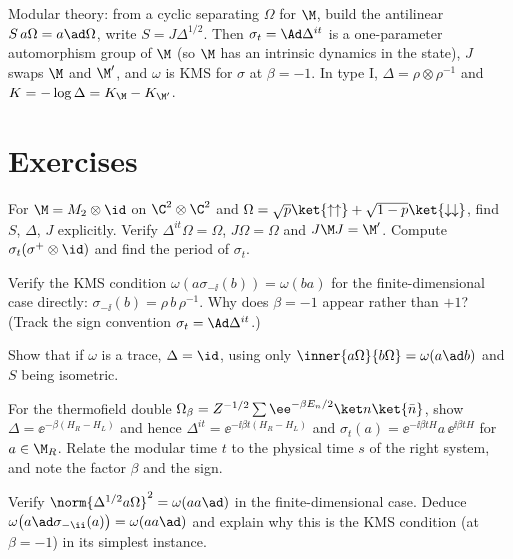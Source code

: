 \begin{keyidea}
Modular theory: from a cyclic separating $\Omega$ for $\M$, build the antilinear $S\,a\Omega=a\ad\Omega$, write $S=J\Delta^{1/2}$. Then $\sigma_t=\Ad\Delta^{it}$ is a one-parameter automorphism group of $\M$ (so $\M$ has an intrinsic dynamics in the state), $J$ swaps $\M$ and $\M'$, and $\omega$ is KMS for $\sigma$ at $\beta=-1$. In type I, $\Delta=\rho\otimes\rho^{-1}$ and $K=-\log\Delta=K_\M-K_{\M'}$.
\end{keyidea}

\section*{Exercises}
\begin{exercise}
For $\M=M_2\otimes\id$ on $\C^2\otimes\C^2$ and $\Omega=\sqrt p\ket{\uparrow\uparrow}+\sqrt{1-p}\ket{\downarrow\downarrow}$, find $S$, $\Delta$, $J$ explicitly. Verify $\Delta^{it}\Omega=\Omega$, $J\Omega=\Omega$ and $J\M J=\M'$. Compute $\sigma_t(\sigma^+\otimes\id)$ and find the period of $\sigma_t$.
\end{exercise}
\begin{exercise}
Verify the KMS condition $\omega(a\sigma_{-\ii}(b))=\omega(ba)$ for the finite-dimensional case directly: $\sigma_{-\ii}(b)=\rho\,b\,\rho^{-1}$. Why does $\beta=-1$ appear rather than $+1$? (Track the sign convention $\sigma_t=\Ad\Delta^{it}$.)
\end{exercise}
\begin{exercise}
Show that if $\omega$ is a trace, $\Delta=\id$, using only $\inner{a\Omega}{b\Omega}=\omega(a\ad b)$ and $S$ being isometric.
\end{exercise}
\begin{exercise}
For the thermofield double $\Omega_\beta=Z^{-1/2}\sum\ee^{-\beta E_n/2}\ket n\ket{\bar n}$, show $\Delta=\ee^{-\beta(H_R-H_L)}$ and hence $\Delta^{it}=\ee^{-\ii\beta t(H_R-H_L)}$ and $\sigma_t(a)=\ee^{-\ii\beta tH}a\,\ee^{\ii\beta tH}$ for $a\in\M_R$. Relate the modular time $t$ to the physical time $s$ of the right system, and note the factor $\beta$ and the sign.
\end{exercise}
\begin{exercise}
Verify $\norm{\Delta^{1/2}a\Omega}^2=\omega(aa\ad)$ in the finite-dimensional case. Deduce $\omega\big(a\ad\sigma_{-\ii}(a)\big)=\omega(aa\ad)$ and explain why this is the KMS condition (at $\beta=-1$) in its simplest instance.
\end{exercise}
